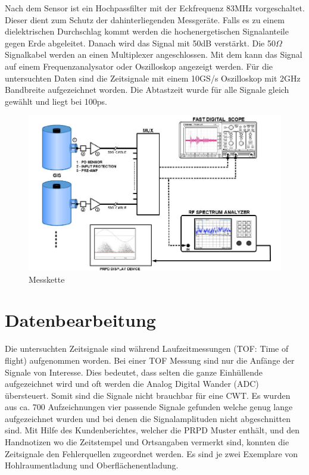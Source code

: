 \begin{refsection}
Nach dem Sensor ist ein Hochpassfilter mit der Eckfrequenz 83MHz vorgeschaltet.
Dieser dient zum Schutz der dahinterliegenden Messgeräte.
Falls es zu einem dielektrischen Durchschlag kommt werden die hochenergetischen Signalanteile gegen Erde abgeleitet.
Danach wird das Signal mit 50dB verstärkt.
Die 50$\Omega$ Signalkabel werden an einen Multiplexer angeschlossen. 
Mit dem kann das Signal auf einem Frequenzanalysator oder Oszilloskop angezeigt werden. 
Für die untersuchten Daten sind die Zeitsignale mit einem 10GS/s Oszilloskop mit 2GHz Bandbreite aufgezeichnet worden.
Die Abtastzeit wurde für alle Signale gleich gewählt und liegt bei 100ps. 
\begin{figure}
	\centering
	\includegraphics[width=0.5\linewidth]{papers/gis/Bilder/MessketteAusGIS}
	\caption{Messkette \cite{report:ABBOnSite}}
	\label{fig:messketteausgis}
\end{figure}

 
\section{Datenbearbeitung}

Die untersuchten Zeitsignale sind während Laufzeitmessungen (TOF: Time of flight) aufgenommen worden. 
Bei einer TOF Messung sind nur die Anfänge der Signale von Interesse.
Dies bedeutet, dass selten die ganze Einhüllende aufgezeichnet wird und oft werden die Analog Digital Wander (ADC) übersteuert. 
Somit sind die Signale nicht brauchbar für eine CWT.
Es wurden aus ca. 700 Aufzeichnungen vier passende Signale gefunden welche genug lange aufgezeichnet wurden und bei denen die Signalamplituden nicht abgeschnitten sind. 
Mit Hilfe des Kundenberichtes, welcher die PRPD Muster enthält, und den Handnotizen wo die Zeitstempel und Ortsangaben vermerkt sind, konnten die Zeitsignale den Fehlerquellen zugeordnet werden.
Es sind je zwei Exemplare von Hohlraumentladung und Oberflächenentladung.
\begin{figure}
	\centering
	

\end{figure}
\end{refsection}
